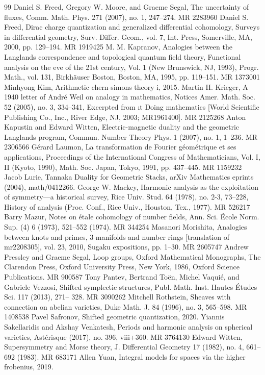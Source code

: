 \begin{thebibliography}{99}
 Daniel S. Freed, Gregory W. Moore, and Graeme Segal, The uncertainty of fluxes, Comm. Math. Phys. 271 (2007), no. 1, 247–274. MR 2283960
 Daniel S. Freed, Dirac charge quantization and generalized differential cohomology, Surveys in differential geometry, Surv. Differ. Geom., vol. 7, Int. Press, Somerville, MA, 2000, pp. 129–194. MR 1919425
 M. M. Kapranov, Analogies between the Langlands correspondence and topological quantum field theory, Functional analysis on the eve of the 21st century, Vol. 1 (New Brunswick, NJ, 1993), Progr. Math., vol. 131, Birkhäuser Boston, Boston, MA, 1995, pp. 119–151. MR 1373001
 Minhyong Kim, Arithmetic chern-simons theory i, 2015.
 Martin H. Krieger, A 1940 letter of André Weil on analogy in mathematics, Notices Amer. Math. Soc. 52 (2005), no. 3, 334–341, Excerpted from ıt Doing mathematics [World Scientific Publishing Co., Inc., River Edge, NJ, 2003; MR1961400]. MR 2125268
 Anton Kapustin and Edward Witten, Electric-magnetic duality and the geometric Langlands program, Commun. Number Theory Phys. 1 (2007), no. 1, 1–236. MR 2306566
 Gérard Laumon, La transformation de Fourier géométrique et ses applications, Proceedings of the International Congress of Mathematicians, Vol. I, II (Kyoto, 1990), Math. Soc. Japan, Tokyo, 1991, pp. 437–445. MR 1159232
 Jacob Lurie, Tannaka Duality for Geometric Stacks, arXiv Mathematics eprints (2004), math/0412266.
 George W. Mackey, Harmonic analysis as the exploitation of symmetry—a historical survey, Rice Univ. Stud. 64 (1978), no. 2-3, 73–228, History of analysis (Proc. Conf., Rice Univ., Houston, Tex., 1977). MR 526217
 Barry Mazur, Notes on étale cohomology of number fields, Ann. Sci. École Norm. Sup. (4) 6 (1973), 521–552 (1974). MR 344254
 Masanori Morishita, Analogies between knots and primes, 3-manifolds and number rings [translation of mr2208305], vol. 23, 2010, Sugaku expositions, pp. 1–30. MR 2605747
 Andrew Pressley and Graeme Segal, Loop groups, Oxford Mathematical Monographs, The Clarendon Press, Oxford University Press, New York, 1986, Oxford Science Publications. MR 900587
 Tony Pantev, Bertrand Toën, Michel Vaquié, and Gabriele Vezzosi, Shifted symplectic structures, Publ. Math. Inst. Hautes Études Sci. 117 (2013), 271– 328. MR 3090262
 Mitchell Rothstein, Sheaves with connection on abelian varieties, Duke Math. J. 84 (1996), no. 3, 565–598. MR 1408538
 Pavel Safronov, Shifted geometric quantization, 2020.
 Yiannis Sakellaridis and Akshay Venkatesh, Periods and harmonic analysis on spherical varieties, Astérisque (2017), no. 396, viii+360. MR 3764130
 Edward Witten, Supersymmetry and Morse theory, J. Differential Geometry 17 (1982), no. 4, 661–692 (1983). MR 683171
 Allen Yuan, Integral models for spaces via the higher frobenius, 2019.
\end{thebibliography}
